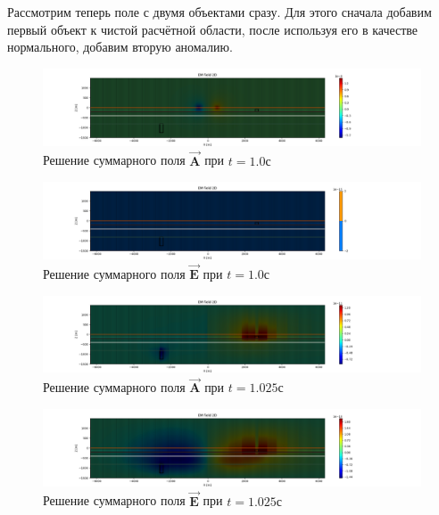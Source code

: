 Рассмотрим теперь поле с двумя объектами сразу. Для этого сначала добавим первый объект к чистой расчётной области, после используя его в качестве нормального, добавим вторую аномалию.

\begin{figure}
	\centering
	\includegraphics[width=1.0\linewidth]{images/Answer_A_both_time_layer_1.png}
	\caption{Решение суммарного поля $\overrightarrow{\textbf{A}}$ при $t = 1.0с$}
	\label{fig:A_both_t0}
\end{figure} 


\begin{figure}
	\centering
	\includegraphics[width=1.0\linewidth]{images/Answer_E_both_time_layer_1.png}
	\caption{Решение суммарного поля $\overrightarrow{\textbf{E}}$ при $t = 1.0с$}
	\label{fig:E_both_t0}
\end{figure} 


\begin{figure}
	\centering
	\includegraphics[width=1.0\linewidth]{images/Answer_A_both_time_layer_1.0250000000000006.png}
	\caption{Решение суммарного поля $\overrightarrow{\textbf{A}}$ при $t = 1.025с$}
	\label{fig:A_both_t1}
\end{figure} 


\begin{figure}
	\centering
	\includegraphics[width=1.0\linewidth]{images/Answer_E_both_time_layer_1.0250000000000006.png}
	\caption{Решение суммарного поля $\overrightarrow{\textbf{E}}$ при $t = 1.025с$}
	\label{fig:E_both_t1}
\end{figure} 

